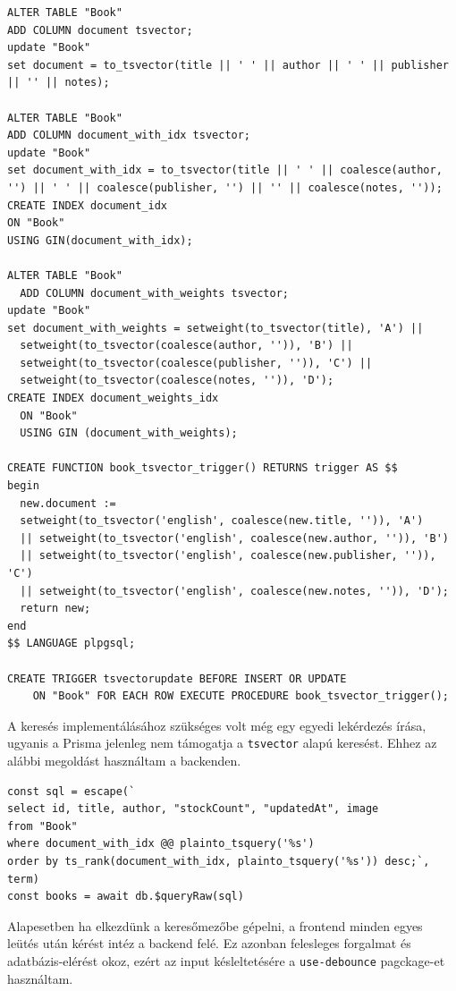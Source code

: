\begin{lstlisting}[caption=A kereséshez szükséges SQL utasítások]
ALTER TABLE "Book"
ADD COLUMN document tsvector;
update "Book"
set document = to_tsvector(title || ' ' || author || ' ' || publisher || '' || notes);

ALTER TABLE "Book"
ADD COLUMN document_with_idx tsvector;
update "Book"
set document_with_idx = to_tsvector(title || ' ' || coalesce(author, '') || ' ' || coalesce(publisher, '') || '' || coalesce(notes, ''));
CREATE INDEX document_idx
ON "Book"
USING GIN(document_with_idx);

ALTER TABLE "Book"
  ADD COLUMN document_with_weights tsvector;
update "Book"
set document_with_weights = setweight(to_tsvector(title), 'A') ||
  setweight(to_tsvector(coalesce(author, '')), 'B') ||
  setweight(to_tsvector(coalesce(publisher, '')), 'C') ||
  setweight(to_tsvector(coalesce(notes, '')), 'D');
CREATE INDEX document_weights_idx
  ON "Book"
  USING GIN (document_with_weights);

CREATE FUNCTION book_tsvector_trigger() RETURNS trigger AS $$
begin
  new.document :=
  setweight(to_tsvector('english', coalesce(new.title, '')), 'A')
  || setweight(to_tsvector('english', coalesce(new.author, '')), 'B')
  || setweight(to_tsvector('english', coalesce(new.publisher, '')), 'C')
  || setweight(to_tsvector('english', coalesce(new.notes, '')), 'D');
  return new;
end
$$ LANGUAGE plpgsql;

CREATE TRIGGER tsvectorupdate BEFORE INSERT OR UPDATE
    ON "Book" FOR EACH ROW EXECUTE PROCEDURE book_tsvector_trigger();

\end{lstlisting}

A keresés implementálásához szükséges volt még egy egyedi lekérdezés írása, ugyanis a Prisma jelenleg nem támogatja a \lstinline|tsvector|
alapú keresést. Ehhez az alábbi megoldást használtam a backenden.

\begin{lstlisting}[caption=Könyvek közti keresés megvalósítása]
const sql = escape(`
select id, title, author, "stockCount", "updatedAt", image
from "Book"
where document_with_idx @@ plainto_tsquery('%s')
order by ts_rank(document_with_idx, plainto_tsquery('%s')) desc;`, term)
const books = await db.$queryRaw(sql)
\end{lstlisting}

Alapesetben ha elkezdünk a keresőmezőbe gépelni, a frontend minden egyes leütés után kérést intéz a backend felé.
Ez azonban felesleges forgalmat és adatbázis-elérést okoz, ezért az input késleltetésére a \lstinline|use-debounce| pagckage-et használtam.

